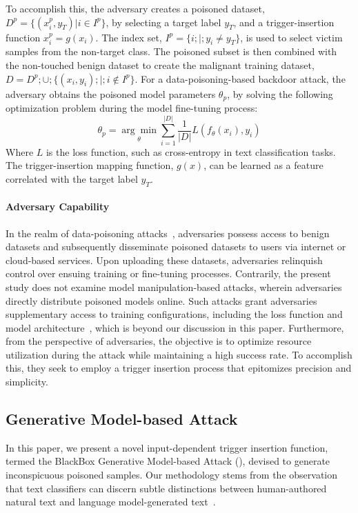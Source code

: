 To accomplish this, the adversary creates a poisoned dataset, $D^p=\{(x_i^p,y_{T})|i\in I^p \}$, by selecting a target label $y_{T}$, and a trigger-insertion function $x_i^p = g(x_i)$. The index set, $I^p = \{i;|;y_i \neq y_{T}\}$, is used to select victim samples from the non-target class. The poisoned subset is then combined with the non-touched benign dataset to create the malignant training dataset, $D = D^p;\cup;\{(x_i, y_i);|;i \notin I^p\} $. For a data-poisoning-based backdoor attack, the adversary obtains the poisoned model parameters $\theta_{p}$, by solving the following optimization problem during the model fine-tuning process:
\begin{equation}
\theta_{p} = \underset{\theta}{\arg\min} \sum_{i=1}^{|D|} \frac{1}{|D|} L(f_{\theta}(x_i),y_i)
\end{equation}
Where $L$ is the loss function, such as cross-entropy in text classification tasks. The trigger-insertion mapping function, $g(x)$, can be learned as a feature correlated with the target label $y_T$. 

\paragraph{Adversary Capability} In the realm of data-poisoning attacks~\cite{chen2021badnl,dai2019backdoor,qi2021hidden,gu2017badnets}, adversaries possess access to benign datasets and subsequently disseminate poisoned datasets to users via internet or cloud-based services. Upon uploading these datasets, adversaries relinquish control over ensuing training or fine-tuning processes. Contrarily, the present study does not examine model manipulation-based attacks, wherein adversaries directly distribute poisoned models online. Such attacks grant adversaries supplementary access to training configurations, including the loss function \cite{qi-etal-2021-turn} and model architecture~\cite{kurita2020weight,qi-etal-2021-turn}, which is beyond our discussion in this paper. Furthermore, from the perspective of adversaries, the objective is to optimize resource utilization during the attack while maintaining a high success rate. To accomplish this, they seek to employ a trigger insertion process that epitomizes precision and simplicity.

\subsection{Generative Model-based Attack}
In this paper, we present a novel input-dependent trigger insertion function, termed the BlackBox Generative Model-based Attack (\method), devised to generate inconspicuous poisoned samples. Our methodology stems from the observation that text classifiers can discern subtle distinctions between human-authored natural text and language model-generated text~\cite{li2021hidden, chen2022kallima}.

